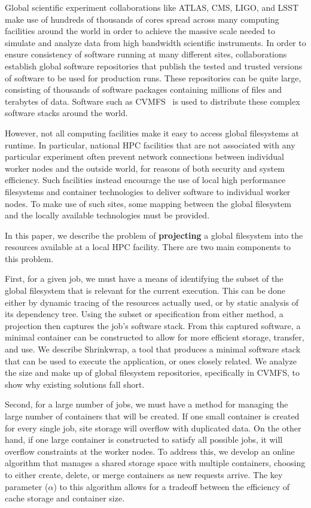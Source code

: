 \documentclass[sigconf]{acmart}
\begin{document}
Global scientific experiment collaborations like ATLAS, CMS, LIGO,
and LSST make use of hundreds of thousands of cores spread across
many computing facilities around the world in order to achieve the 
massive scale needed to simulate and analyze data from high bandwidth
scientific instruments.  In order to ensure consistency of software
running at many different sites, collaborations establish global
software repositories that publish the tested and trusted versions
of software to be used for production runs.  These repositories
can be quite large, consisting of thousands of software packages
containing millions of files and terabytes of data.  Software
such as CVMFS~\cite{globalfs-cise-2015} is used to distribute
these complex software stacks around the world.

However, not all computing facilities make it easy to access global filesystems at runtime.
In particular, national HPC facilities that are not associated with any
particular experiment often prevent network connections between
individual worker nodes and the outside world, for reasons
of both security and system efficiency.  Such facilities instead
encourage the use of local high performance filesystems and container
technologies to deliver software to individual worker nodes.
To make use of such sites, some mapping between the global
filesystem and the locally available technologies must be provided.

In this paper, we describe the problem of {\bf projecting} a global
filesystem into the resources available at a local HPC facility.
There are two main components to this problem.

First, for a given job, we must have a means of identifying the
subset of the global filesystem that is relevant for the current
execution.  This can be done either by dynamic tracing of the resources
actually used, or by static analysis of its dependency tree.
Using the subset or specification from either method, a projection
then captures the job's software stack.
From this captured software, a minimal container can be
constructed to allow for more efficient storage, transfer, 
and use. We describe Shrinkwrap, 
a tool that produces a minimal software stack 
that can be used to execute the application, or ones closely related.
We analyze the size and make up of global filesystem repositories,
specifically in CVMFS, to show why existing solutions fall short.

Second, for a large number of jobs, we must have a method for
managing the large number of containers that will be created.
If one small container is created for every single job,
site storage will overflow with duplicated data.  On the other
hand, if one large container is constructed to satisfy all
possible jobs, it will overflow constraints at the worker nodes.
To address this, we develop an online algorithm that manages
a shared storage space with multiple containers, choosing to
either create, delete, or merge containers as new requests arrive.
The key parameter ($\alpha$) to this algorithm allows for a
tradeoff between the efficiency of cache storage and container size.
\end{document}
